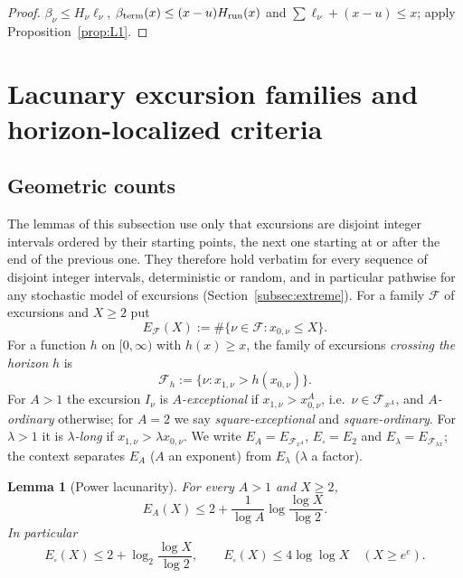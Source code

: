 \documentclass[11pt]{amsart}
\numberwithin{equation}{section}
\theoremstyle{plain}
\newtheorem{lemma}[theorem]{Lemma}
\theoremstyle{definition}
\theoremstyle{remark}
\newcommand{\F}{\mathcal{F}}
\begin{document}
\begin{proof}
$\beta_\nu\le H_\nu\ell_\nu$, $\beta_{\rm term}(x)\le(x-u)H_{\rm run}(x)$ and
$\sum\ell_\nu+(x-u)\le x$; apply Proposition~\ref{prop:L1}.
\end{proof}

\section{Lacunary excursion families and horizon-localized criteria}
\label{sec:lacunary}

\subsection{Geometric counts}
\label{subsec:geometric}

The lemmas of this subsection use only that excursions are disjoint integer
intervals ordered by their starting points, the next one starting at or
after the end of the previous one. They therefore hold verbatim for every
sequence of disjoint integer intervals, deterministic or random, and in
particular pathwise for any stochastic model of excursions
(Section~\ref{subsec:extreme}). For a family $\F$ of excursions and $X\ge2$
put
\[
E_\F(X):=\#\{\nu\in\F:x_{0,\nu}\le X\}.
\]
For a function $h$ on $[0,\infty)$ with $h(x)\ge x$, the family of
excursions \emph{crossing the horizon} $h$ is
\[
\F_h:=\{\nu:x_{1,\nu}>h(x_{0,\nu})\}.
\]
For $A>1$ the excursion $I_\nu$ is \emph{$A$-exceptional} if
$x_{1,\nu}>x_{0,\nu}^A$, i.e.\ $\nu\in\F_{x^A}$, and \emph{$A$-ordinary}
otherwise; for $A=2$ we say \emph{square-exceptional} and
\emph{square-ordinary}. For $\lambda>1$ it is \emph{$\lambda$-long} if
$x_{1,\nu}>\lambda x_{0,\nu}$. We write $E_A=E_{\F_{x^A}}$,
$E_\square=E_2$ and $E_\lambda=E_{\F_{\lambda x}}$; the context separates
$E_A$ ($A$ an exponent) from $E_\lambda$ ($\lambda$ a factor).

\begin{lemma}[Power lacunarity]
\label{lem:power-lacunary}
For every $A>1$ and $X\ge2$,
\begin{equation}
\label{eq:power-lacunary-count}
E_A(X)\le2+\frac1{\log A}\log\frac{\log X}{\log2}.
\end{equation}
In particular
\begin{equation}
\label{eq:square-exception-count}
E_\square(X)\le2+\log_2\frac{\log X}{\log2},\qquad
E_\square(X)\le4\log\log X\quad(X\ge e^e).
\end{equation}
\end{lemma}
\end{document}
